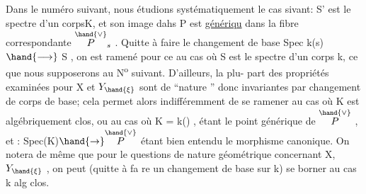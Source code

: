 Dans le numéro suivant, nous étudions systématiquement le cas
sivant: S' est le spectre d'un corpsK, et son image dahs P est \uline{génériqu}
dans la fibre correspondante $\overset{\hand{\vee}}{P}_s$ . Quitte à faire le changement de base
Spec k(s) $\hand{\longrightarrow}$ S , on est ramené pour ce au cas où S est le spectre
d'un corps k, ce que nous supposerons au N\textsuperscript{o} suivant. D'ailleurs, la plu-%
part des propriétés examinées pour X et $Y_{\hand{\xi}}$ sont de ``nature ''
donc invariantes par changement de corps de base; cela permet alors
indifféremment de se ramener au cas où K est algébriquement clos, ou au
cas où K = k(\hand{$\eta$}) , \hand{$\eta$} étant le point générique de $\overset{\hand{\vee}}{P}$ , et \hand{$\xi$} : Spec(K)$\hand{\to}\overset{\hand{\vee}}{P}$
étant bien entendu le morphisme canonique. On notera de même que pour le
questions de nature géométrique concernant X, $Y_{\hand{\xi}}$ , on peut (quitte à fa
re un changement de base sur k) se borner au cas k alg clos.

